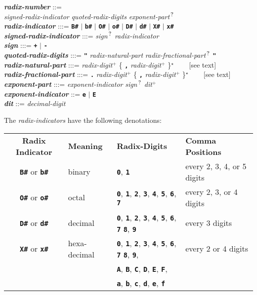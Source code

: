 \documentclass[12pt]{article}
\newcommand{\TT}[1]{{\tt \bfseries #1}}
\newcommand{\ttkey}[1]{{\tt \bfseries #1}}
\newcommand{\emkey}[1]{{\em \bfseries #1}}
\newcommand{\STAR}{{\Large $^\star$}}
\newcommand{\PLUS}[1][]{{$^{+#1}$}}
\newcommand{\QMARK}{{$^{\,\mbox{\footnotesize ?}}$}}
\newenvironment{indpar}[1][0.3in]%
	{\begin{list}{}%
		     {\setlength{\itemsep}{0in}%
		      \setlength{\topsep}{0in}%
		      \setlength{\parsep}{1ex}%
		      \setlength{\labelwidth}{#1}%
		      \setlength{\leftmargin}{#1}%
		      \addtolength{\leftmargin}{\labelsep}}%
	 \item}%
	{\end{list}}
\begin{document}
\begin{indpar}
\emkey{radix-number} ::= \\
\hspace*{0.2in}
    {\em signed-radix-indicator} {\em quoted-radix-digits}
    {\em exponent-part}\QMARK{}
\\[1ex]
\emkey{radix-indicator} :::= \TT{B\#} $|$ \TT{b\#} $|$
                            \TT{O\#} $|$ \TT{o\#} $|$
			    \TT{D\#} $|$ \TT{d\#} $|$
			    \TT{X\#} $|$ \TT{x\#}
\\[1ex]
\emkey{signed-radix-indicator} :::= {\em sign}\QMARK{} {\em radix-indicator}
\\[1ex]
\emkey{sign} :::= \TT{+} $|$ \TT{-}
\\[1ex]
\emkey{quoted-radix-digits} :::= \TT{"} {\em radix-natural-part}
				{\em radix-fractional-part}\QMARK{} \TT{"}
\\[1ex]
\emkey{radix-natural-part} :::= {\em radix-digit}\PLUS{}
	    \{ \TT{,} {\em radix-digit}\PLUS{} \}\STAR{} ~~~ [see text]
\\[1ex]
\emkey{radix-fractional-part} :::= \TT{.} {\em radix-digit}\PLUS{}
	    \{ \TT{,} {\em radix-digit}\PLUS{} \}\STAR{} ~~~ [see text]
\\[1ex]
\emkey{exponent-part} :::= {\em exponent-indicator} {\em sign}\QMARK{}
                          {\em dit}\PLUS{}
\\[1ex] 
\emkey{exponent-indicator} ::= \TT{e} $|$ \TT{E}
\\[1ex] 
\emkey{dit} ::= {\em decimal-digit}
\end{indpar}

The {\em radix-indicators} have the following denotations:

\begin{center}
\begin{tabular}{clll}
\bf Radix Indicator
	& \bf Meaning	& \bf Radix-Digits	& \bf Comma Positions
\\[1ex]
\ttkey{B\#} or \ttkey{b\#}
        & binary	& \TT{0}, \TT{1}	& every 2, 3, 4, or 5 digits \\
\ttkey{O\#} or \ttkey{o\#}
        & octal		& \TT{0}, \TT{1}, \TT{2}, \TT{3},
			  \TT{4}, \TT{5}, \TT{6}, \TT{7}
			  			& every 2, 3, or 4 digits \\
\ttkey{D\#} or \ttkey{d\#}
        & decimal	& \TT{0}, \TT{1}, \TT{2}, \TT{3},
			  \TT{4}, \TT{5}, \TT{6}, \TT{7}
			  \TT{8}, \TT{9}	& every 3 digits \\
\ttkey{X\#} or \ttkey{x\#}
        & hexa-decimal	& \TT{0}, \TT{1}, \TT{2}, \TT{3},
			  \TT{4}, \TT{5}, \TT{6}, \TT{7}
			  \TT{8}, \TT{9},	& every 2 or 4 digits \\
	&		& \TT{A}, \TT{B}, \TT{C}, \TT{D},
			  \TT{E}, \TT{F}, \\
	&		& \TT{a}, \TT{b}, \TT{c}, \TT{d},
			  \TT{e}, \TT{f} \\
\end{tabular}
\end{center}
\end{document}
